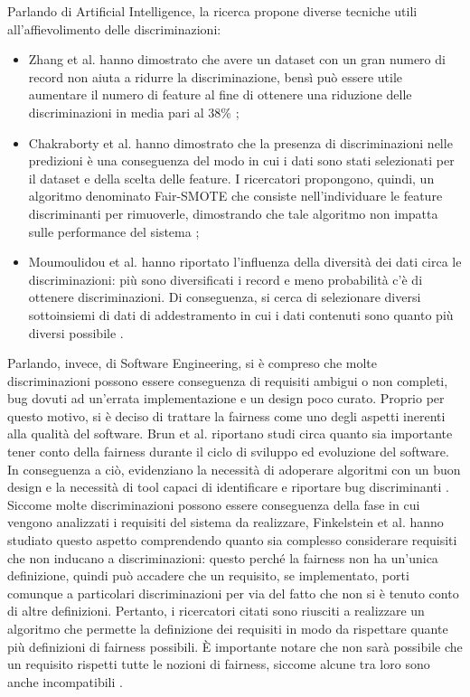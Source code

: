 
Parlando di Artificial Intelligence, la ricerca propone diverse tecniche utili all'affievolimento delle discriminazioni:
\begin{itemize}
    \item Zhang et al. hanno dimostrato che avere un dataset con un gran numero di record non aiuta a ridurre la discriminazione, bensì può essere utile aumentare il numero di feature al fine di ottenere una riduzione delle discriminazioni in media pari al 38\% \cite{zhang2021ignorance};
    \item Chakraborty et al. hanno dimostrato che la presenza di discriminazioni nelle predizioni è una conseguenza del modo in cui i dati sono stati selezionati per il dataset e della scelta delle feature. I ricercatori propongono, quindi, un algoritmo denominato Fair-SMOTE che consiste nell'individuare le feature discriminanti per rimuoverle, dimostrando che tale algoritmo non impatta sulle performance del sistema \cite{chakraborty2021bias};
    \item Moumoulidou et al. hanno riportato l'influenza della diversità dei dati circa le discriminazioni: più sono diversificati i record e meno probabilità c'è di ottenere discriminazioni. Di conseguenza, si cerca di selezionare diversi sottoinsiemi di dati di addestramento in cui i dati contenuti sono quanto più diversi possibile \cite{moumoulidou2020diverse}.
\end{itemize}
Parlando, invece, di Software Engineering, si è compreso che molte discriminazioni possono essere conseguenza di requisiti ambigui o non completi, bug dovuti ad un'errata implementazione e un design poco curato. Proprio per questo motivo, si è deciso di trattare la fairness come uno degli aspetti inerenti alla qualità del software. Brun et al. riportano studi circa quanto sia importante tener conto della fairness durante il ciclo di sviluppo ed evoluzione del software. In conseguenza a ciò, evidenziano la necessità di adoperare algoritmi con un buon design e la necessità di tool capaci di identificare e riportare bug discriminanti \cite{brun2018software}.\\
Siccome molte discriminazioni possono essere conseguenza della fase in cui vengono analizzati i requisiti del sistema da realizzare, Finkelstein et al. hanno studiato questo aspetto comprendendo quanto sia complesso considerare requisiti che non inducano a discriminazioni: questo perché la fairness non ha un'unica definizione, quindi può accadere che un requisito, se implementato, porti comunque a particolari discriminazioni per via del fatto che non si è tenuto conto di altre definizioni. Pertanto, i ricercatori citati sono riusciti a realizzare un algoritmo che permette la definizione dei requisiti in modo da rispettare quante più definizioni di fairness possibili. È importante notare che non sarà possibile che un requisito rispetti tutte le nozioni di fairness, siccome alcune tra loro sono anche incompatibili \cite{finkelstein2008fairness}.\\
